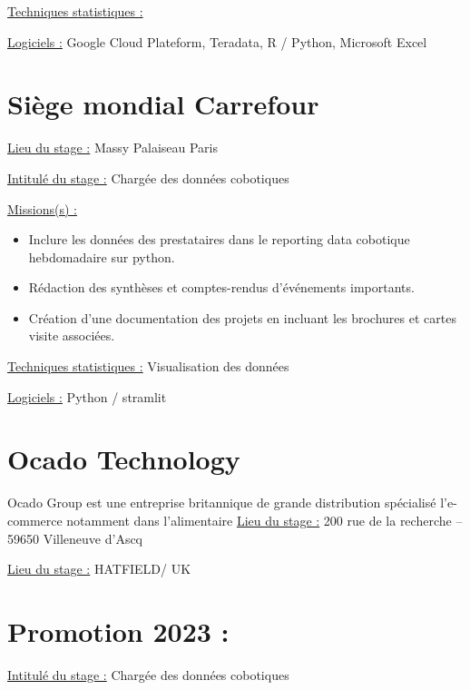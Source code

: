 \documentclass[
  letterpaper,
  DIV=11,
  numbers=noendperiod]{scrreprt}
\begin{document}
\uline{Techniques statistiques :}

\uline{Logiciels :} Google Cloud Plateform, Teradata, R / Python,
Microsoft Excel

\hypertarget{siuxe8ge-mondial-carrefour}{%
\section{\texorpdfstring{\textbf{Siège mondial
Carrefour}}{Siège mondial Carrefour}}\label{siuxe8ge-mondial-carrefour}}

\uline{Lieu du stage :} Massy Palaiseau Paris

\uline{Intitulé du stage :} Chargée des données cobotiques

\uline{Missions(s) :}

\begin{itemize}
\item
  Inclure les données des prestataires dans le reporting data cobotique
  hebdomadaire sur python.
\item
  Rédaction des synthèses et comptes-rendus d'événements importants.
\item
  Création d'une documentation des projets en incluant les brochures et
  cartes visite associées.
\end{itemize}

\uline{Techniques statistiques :} Visualisation des données

\uline{Logiciels :} Python / stramlit

\hypertarget{ocado-technology}{%
\section{\texorpdfstring{\textbf{Ocado
Technology}}{Ocado Technology}}\label{ocado-technology}}

Ocado Group est une entreprise britannique de grande distribution
spécialisé l'e- commerce notamment dans l'alimentaire \uline{Lieu du
stage :} 200 rue de la recherche -- 59650 Villeneuve d'Ascq

\uline{Lieu du stage :} HATFIELD/ UK

\hypertarget{promotion-2023}{%
\section{\texorpdfstring{\textbf{Promotion 2023
:}}{Promotion 2023 :}}\label{promotion-2023}}

\uline{Intitulé du stage :} Chargée des données cobotiques
\end{document}

